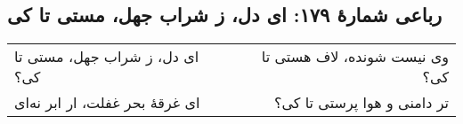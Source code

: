 \begin{center}
\section*{رباعی شمارهٔ ۱۷۹: ای دل، ز شراب جهل، مستی تا کی}
\label{sec:179}
\begin{longtable}{l p{0.5cm} r}
ای دل، ز شراب جهل، مستی تا کی؟
&&
وی نیست شونده، لاف هستی تا کی؟
\\
ای غرقهٔ بحر غفلت، ار ابر نه‌ای
&&
تر دامنی و هوا پرستی تا کی؟
\\
\end{longtable}
\end{center}
